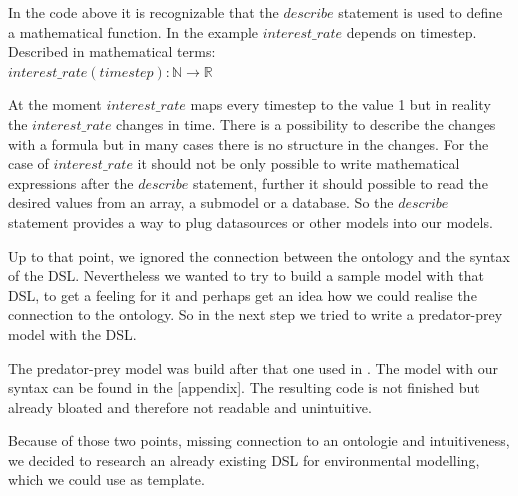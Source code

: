 \par
In the code above it is recognizable that the $describe$ statement is used to define a mathematical function. In the example $interest\_rate$ depends on timestep. Described in mathematical terms:\\
$interest\_rate(timestep) : \mathbb{N} \rightarrow  \mathbb{R}$
\par
At the moment $interest\_rate$ maps every timestep to the value 1 but in reality the $interest\_rate$ changes in time. There is a possibility to describe the changes with a formula but in many cases there is no structure in the changes. For the case of $interest\_rate$ it should not be only possible to write mathematical expressions after the $describe$ statement, further it should possible to read the desired values from an array, a submodel or a database. So the $describe$ statement provides a way to plug datasources or other models into our models.
\par
Up to that point, we ignored the connection between the ontology and the syntax of the DSL. Nevertheless we wanted to try to build a sample model with that DSL, to get a feeling for it and perhaps get an idea how we could realise the connection to the ontology. So in the next step we tried to write a predator-prey model with the DSL.
\par
The predator-prey model was build after that one used in \autocite{dsl:dynamo}. The model with our syntax can be found in the [appendix].
The resulting code is not finished but already bloated and therefore not readable and unintuitive.
\par
Because of those two points, missing connection to an ontologie and intuitiveness, we decided to research an already existing DSL for environmental modelling, which we could use as template.

